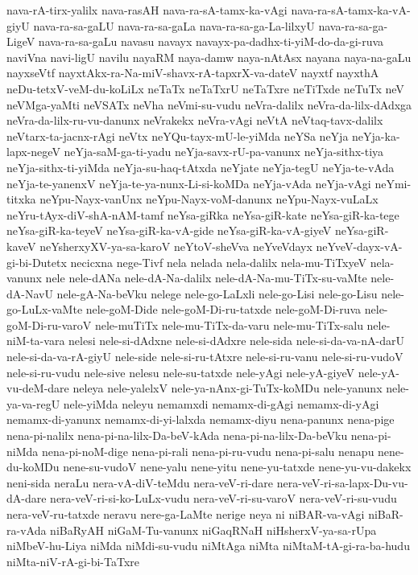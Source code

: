 {nava-rA-tirx-yalilx
nava-rasAH
nava-ra-sA-tamx-ka-vAgi
nava-ra-sA-tamx-ka-vA-giyU
nava-ra-sa-gaLU
nava-ra-sa-gaLa
nava-ra-sa-ga-La-lilxyU
nava-ra-sa-ga-LigeV
nava-ra-sa-gaLu
navasu
navayx
navayx-pa-dadhx-ti-yiM-do-da-gi-ruva
naviVna
navi-ligU
navilu
nayaRM
naya-damw
naya-nAtAsx
nayana
naya-na-gaLu
nayxseVtf
nayxtAkx-ra-Na-miV-shavx-rA-tapxrX-va-dateV
nayxtf
nayxthA
neDu-tetxV-veM-du-koLiLx
neTaTx
neTaTxrU
neTaTxre
neTiTxde
neTuTx
neV
neVMga-yaMti
neVSATx
neVha
neVmi-su-vudu
neVra-dalilx
neVra-da-lilx-dAdxga
neVra-da-lilx-ru-vu-danunx
neVrakekx
neVra-vAgi
neVtA
neVtaq-tavx-dalilx
neVtarx-ta-jacnx-rAgi
neVtx
neYQu-tayx-mU-le-yiMda
neYSa
neYja
neYja-ka-lapx-negeV
neYja-saM-ga-ti-yadu
neYja-savx-rU-pa-vanunx
neYja-sithx-tiya
neYja-sithx-ti-yiMda
neYja-su-haq-tAtxda
neYjate
neYja-tegU
neYja-te-vAda
neYja-te-yanenxV
neYja-te-ya-nunx-Li-si-koMDa
neYja-vAda
neYja-vAgi
neYmi-titxka
neYpu-Nayx-vanUnx
neYpu-Nayx-voM-danunx
neYpu-Nayx-vuLaLx
neYru-tAyx-diV-shA-nAM-tamf
neYsa-giRka
neYsa-giR-kate
neYsa-giR-ka-tege
neYsa-giR-ka-teyeV
neYsa-giR-ka-vA-gide
neYsa-giR-ka-vA-giyeV
neYsa-giR-kaveV
neYsherxyXV-ya-sa-karoV
neYtoV-sheVva
neYveVdayx
neYveV-dayx-vA-gi-bi-Dutetx
necicxna
nege-Tivf
nela
nelada
nela-dalilx
nela-mu-TiTxyeV
nela-vanunx
nele
nele-dANa
nele-dA-Na-dalilx
nele-dA-Na-mu-TiTx-su-vaMte
nele-dA-NavU
nele-gA-Na-beVku
nelege
nele-go-LaLxli
nele-go-Lisi
nele-go-Lisu
nele-go-LuLx-vaMte
nele-goM-Dide
nele-goM-Di-ru-tatxde
nele-goM-Di-ruva
nele-goM-Di-ru-varoV
nele-muTiTx
nele-mu-TiTx-da-varu
nele-mu-TiTx-salu
nele-niM-ta-vara
nelesi
nele-si-dAdxne
nele-si-dAdxre
nele-sida
nele-si-da-va-nA-darU
nele-si-da-va-rA-giyU
nele-side
nele-si-ru-tAtxre
nele-si-ru-vanu
nele-si-ru-vudoV
nele-si-ru-vudu
nele-sive
nelesu
nele-su-tatxde
nele-yAgi
nele-yA-giyeV
nele-yA-vu-deM-dare
neleya
nele-yalelxV
nele-ya-nAnx-gi-TuTx-koMDu
nele-yanunx
nele-ya-va-regU
nele-yiMda
neleyu
nemamxdi
nemamx-di-gAgi
nemamx-di-yAgi
nemamx-di-yanunx
nemamx-di-yi-lalxda
nemamx-diyu
nena-panunx
nena-pige
nena-pi-nalilx
nena-pi-na-lilx-Da-beV-kAda
nena-pi-na-lilx-Da-beVku
nena-pi-niMda
nena-pi-noM-dige
nena-pi-rali
nena-pi-ru-vudu
nena-pi-salu
nenapu
nene-du-koMDu
nene-su-vudoV
nene-yalu
nene-yitu
nene-yu-tatxde
nene-yu-vu-dakekx
neni-sida
neraLu
nera-vA-diV-teMdu
nera-veV-ri-dare
nera-veV-ri-sa-lapx-Du-vu-dA-dare
nera-veV-ri-si-ko-LuLx-vudu
nera-veV-ri-su-varoV
nera-veV-ri-su-vudu
nera-veV-ru-tatxde
neravu
nere-ga-LaMte
nerige
neya
ni
niBAR-va-vAgi
niBaR-ra-vAda
niBaRyAH
niGaM-Tu-vanunx
niGaqRNaH
niHsherxV-ya-sa-rUpa
niMbeV-hu-Liya
niMda
niMdi-su-vudu
niMtAga
niMta
niMtaM-tA-gi-ra-ba-hudu
niMta-niV-rA-gi-bi-TaTxre
}
